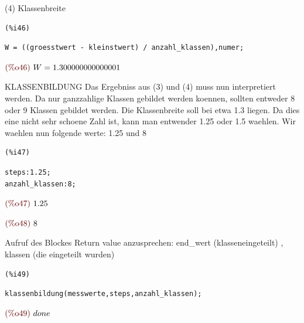 \documentclass{article}
\begin{document}
(4)
Klassenbreite

\noindent
\begin{minipage}[t]{8ex}{\color{red}\bf
\begin{verbatim}
(%i46) 
\end{verbatim}}
\end{minipage}
\begin{minipage}[t]{\textwidth}{\color{blue}
\begin{verbatim}
W = ((groesstwert - kleinstwert) / anzahl_klassen),numer;
\end{verbatim}}
\end{minipage}
\begin{math}\displaystyle
\parbox{8ex}{\color{labelcolor}(\%o46) }
W=1.300000000000001
\end{math}

KLASSENBILDUNG
Das Ergebniss aus (3) und (4) muss nun interpretiert werden.
Da nur ganzzahlige Klassen gebildet werden koennen, sollten entweder 8 oder 9 Klassen gebildet werden.
Die Klassenbreite soll bei etwa 1.3 liegen. Da dies eine nicht sehr schoene Zahl ist, kann man entwender 1.25 oder 1.5 waehlen.
Wir waehlen nun folgende werte:
1.25 und 8

\noindent
\begin{minipage}[t]{8ex}{\color{red}\bf
\begin{verbatim}
(%i47) 
\end{verbatim}}
\end{minipage}
\begin{minipage}[t]{\textwidth}{\color{blue}
\begin{verbatim}
steps:1.25;
anzahl_klassen:8;
\end{verbatim}}
\end{minipage}
\begin{math}\displaystyle
\parbox{8ex}{\color{labelcolor}(\%o47) }
1.25
\end{math}

\begin{math}\displaystyle
\parbox{8ex}{\color{labelcolor}(\%o48) }
8
\end{math}

Aufruf des Blockes
Return value anzusprechen: end\_wert (klasseneingeteilt) , klassen (die eingeteilt wurden)

\noindent
\begin{minipage}[t]{8ex}{\color{red}\bf
\begin{verbatim}
(%i49) 
\end{verbatim}}
\end{minipage}
\begin{minipage}[t]{\textwidth}{\color{blue}
\begin{verbatim}
klassenbildung(messwerte,steps,anzahl_klassen);
\end{verbatim}}
\end{minipage}
\begin{math}\displaystyle
\parbox{8ex}{\color{labelcolor}(\%o49) }
done
\end{math}
\end{document}
